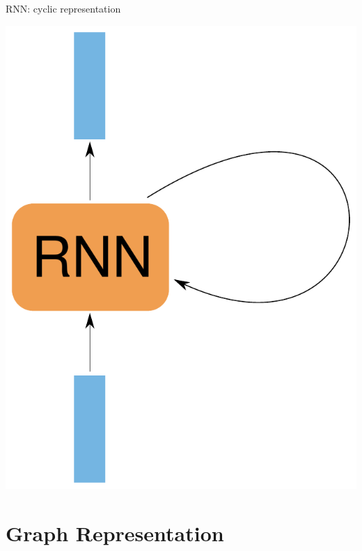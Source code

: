 \documentclass[10pt]{beamer}
\begin{document}
\begin{frame}[fragile]{RNN: cyclic representation}
\begin{center}
\includegraphics[scale=0.5]{images/RNNnaive2.pdf}
\end{center}
\end{frame}


\section{Graph Representation}
\end{document}
